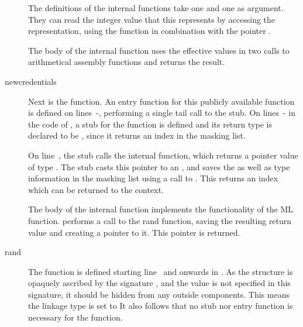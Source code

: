 \begin{description}
The definitions of the internal functions take one  and one  as argument.
They can read the integer value that this  represents by accessing the representation, using the  function in combination with the pointer .

The body of the internal function uses the effective values in two calls to arithmetical assembly functions and returns the result.

\item[newcredentials] Next is the  function.
An entry function for this publicly available function is defined on lines~-, performing a single tail call to the stub.
On lines~- in the code of , a stub for the function is defined and its return type is declared to be , since it returns an index in the masking list.

On line~, the stub calls the internal function, which returns a pointer value of type .
The stub casts this pointer to an , and saves the  as well as type information in the masking list using a call to .
This returns an index which can be returned to the context.


The body of the internal function  implements the functionality of the ML  function.
 performs a call to the rand function, saving the resulting return value and creating a pointer to it.
This pointer is returned.

\item[rand] The function  is defined starting line~ and onwards in .
As the structure  is opaquely ascribed by the signature , and the value  is not specified in this signature, it should be hidden from any outside components.
This means the linkage type is set to 
It also follows that no stub nor entry function is necessary for the  function.


\end{description}
